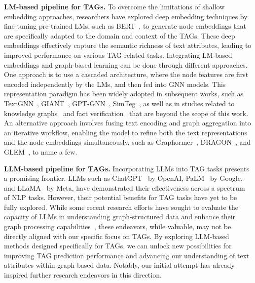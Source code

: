 \documentclass{article}
\begin{document}
\textbf{LM-based pipeline for TAGs.}
To overcome the limitations of shallow embedding approaches, researchers have explored deep embedding techniques by fine-tuning pre-trained LMs, such as BERT~\citep{devlin2018bert}, to generate node embeddings that are specifically adapted to the domain and context of the TAGs. These deep embeddings effectively capture the semantic richness of text attributes, leading to improved performance on various TAG-related tasks. Integrating LM-based embeddings and graph-based learning can be done through different approaches. One approach is to use a cascaded architecture, where the node features are first encoded independently by the LMs, and then fed into GNN models. This representation paradigm has been widely adopted in subsequent works, such as TextGNN~\citep{zhu2021textgnn}, GIANT~\citep{chien2021node_giant}, GPT-GNN~\citep{hu2020gpt_gnn}, SimTeg~\citep{duan2023simteg}, as well as in studies related to knowledge graphs~\citep{yasunaga2021qa, zhang2022greaselm} and  fact verification~\citep{liu2019fine_fact_verify, zhou2019gear} that are beyond the scope of this work. An alternative approach involves fusing text encoding and graph aggregation into an iterative workflow, enabling the model to refine both the text representations and the node embeddings simultaneously, such as Graphormer~\citep{yang2021graphformers}, DRAGON~\citep{yasunaga2022deep_dragon}, and GLEM~\citep{zhao2022learning_em}, to name a few. 



\textbf{LLM-based pipeline for TAGs.}
Incorporating LLMs into TAG tasks presents a promising frontier. LLMs such as ChatGPT~\citep{brown2020language_gpt} by OpenAI, PaLM~\citep{chowdhery2022palm} by Google, and LLaMA~\citep{touvron2023llama} by Meta, have demonstrated their effectiveness across a spectrum of NLP tasks. However, their potential benefits for TAG tasks have yet to be fully explored. While some recent research efforts have sought to evaluate the capacity of LLMs in understanding graph-structured data and enhance their graph processing capabilities~\citep{wang2023can, zhang2023graph_toolformer, guo2023gpt4graph}, these endeavors, while valuable, may not be directly aligned with our specific focus on TAGs. By exploring LLM-based methods designed specifically for TAGs, we can unlock new possibilities for improving TAG prediction performance and advancing our understanding of text attributes within graph-based data. Notably, our initial attempt has already inspired further research endeavors in this direction.
\end{document}
